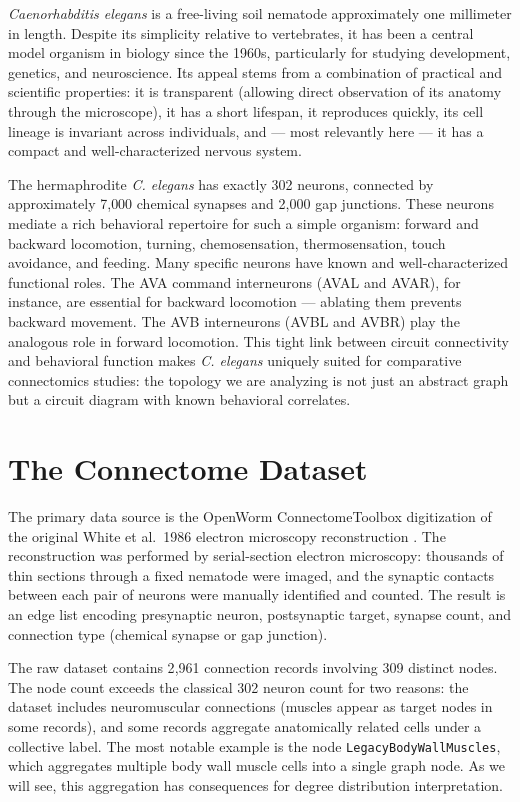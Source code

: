 \documentclass[12pt,a4paper]{report}
\begin{document}
\textit{Caenorhabditis elegans} is a free-living soil nematode approximately one millimeter in length. Despite its simplicity relative to vertebrates, it has been a central model organism in biology since the 1960s, particularly for studying development, genetics, and neuroscience. Its appeal stems from a combination of practical and scientific properties: it is transparent (allowing direct observation of its anatomy through the microscope), it has a short lifespan, it reproduces quickly, its cell lineage is invariant across individuals, and — most relevantly here — it has a compact and well-characterized nervous system.

The hermaphrodite \textit{C. elegans} has exactly 302 neurons, connected by approximately 7{,}000 chemical synapses and 2{,}000 gap junctions. These neurons mediate a rich behavioral repertoire for such a simple organism: forward and backward locomotion, turning, chemosensation, thermosensation, touch avoidance, and feeding. Many specific neurons have known and well-characterized functional roles. The AVA command interneurons (AVAL and AVAR), for instance, are essential for backward locomotion — ablating them prevents backward movement. The AVB interneurons (AVBL and AVBR) play the analogous role in forward locomotion. This tight link between circuit connectivity and behavioral function makes \textit{C. elegans} uniquely suited for comparative connectomics studies: the topology we are analyzing is not just an abstract graph but a circuit diagram with known behavioral correlates.

\section{The Connectome Dataset}

The primary data source is the OpenWorm ConnectomeToolbox digitization of the original White et al.\ 1986 electron microscopy reconstruction \cite{white1986structure,openwormtoolbox}. The reconstruction was performed by serial-section electron microscopy: thousands of thin sections through a fixed nematode were imaged, and the synaptic contacts between each pair of neurons were manually identified and counted. The result is an edge list encoding presynaptic neuron, postsynaptic target, synapse count, and connection type (chemical synapse or gap junction).

The raw dataset contains 2{,}961 connection records involving 309 distinct nodes. The node count exceeds the classical 302 neuron count for two reasons: the dataset includes neuromuscular connections (muscles appear as target nodes in some records), and some records aggregate anatomically related cells under a collective label. The most notable example is the node \texttt{LegacyBodyWallMuscles}, which aggregates multiple body wall muscle cells into a single graph node. As we will see, this aggregation has consequences for degree distribution interpretation.
\end{document}
